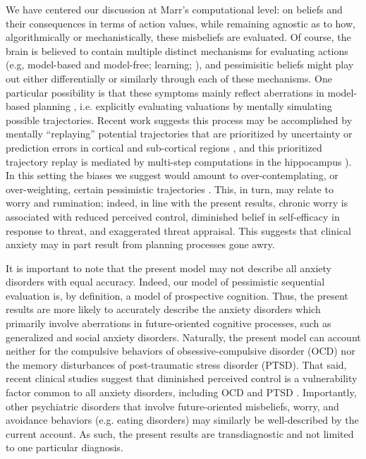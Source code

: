 \documentclass[11pt]{article} %
\begin{document}
We have centered our discussion at Marr's \cite{marr1982} computational level: on beliefs and their consequences in terms of action values, while remaining agnostic as to how, algorithmically or mechanistically, these misbeliefs are evaluated. Of course, the brain is believed to contain multiple distinct mechanisms for evaluating actions (e.g, model-based and model-free; learning; \cite{daw2005, huys2015}), and pessimisitic beliefs might play out either differentially or similarly through each of these mechanisms. One particular possibility is that these symptoms mainly reflect aberrations in model-based planning \cite{huys2015}, i.e. explicitly evaluating valuations by mentally simulating possible trajectories. Recent work suggests this process may be accomplished by mentally ``replaying'' potential trajectories that are prioritized by uncertainty or prediction errors in cortical and sub-cortical regions \cite{momennejad_offline_2018}, and this prioritized trajectory replay is mediated by multi-step computations in the hippocampus \cite{mattar2018}). In this setting the biases we suggest would amount to over-contemplating, or over-weighting, certain pessimistic trajectories \cite{hunter2019}. This, in turn, may relate to worry and rumination; indeed, in line with the present results, chronic worry is associated with reduced perceived control, diminished belief in self-efficacy in response to threat, and exaggerated threat appraisal\cite{Berenbaum2010}. This suggests that clinical anxiety may in part result from planning processes gone awry. 

It is important to note that the present model may not describe all anxiety disorders with equal accuracy. Indeed, our model of pessimistic sequential evaluation is, by definition, a model of prospective cognition. Thus, the present results are more likely to accurately describe the anxiety disorders which primarily involve aberrations in future-oriented cognitive processes, such as generalized and social anxiety disorders. Naturally, the present model can account neither for the compulsive behaviors of obsessive-compulsive disorder (OCD) nor the memory disturbances of post-traumatic stress disorder (PTSD). That said, recent clinical studies suggest that diminished perceived control is a vulnerability factor common to all anxiety disorders, including OCD and PTSD \citep{gallagher2014a, gallagher2014b}. Importantly, other psychiatric disorders that involve future-oriented misbeliefs, worry, and avoidance behaviors (e.g. eating disorders\citep{konstantellou2011}) may similarly be well-described by the current account. As such, the present results are transdiagnostic and not limited to one particular diagnosis. 
\end{document}
